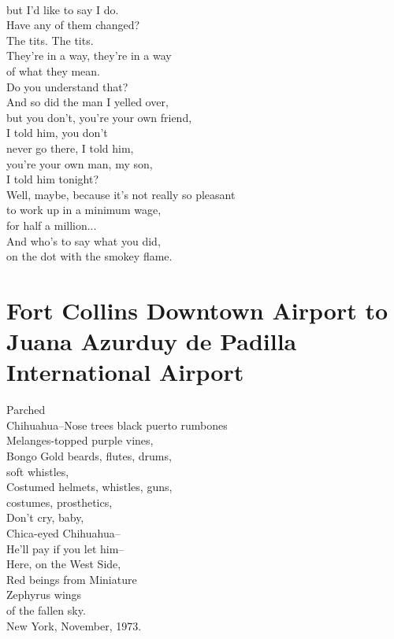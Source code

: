 \documentclass[smalldemyvopaper,11pt,twoside,onecolumn,openright,extrafontsizes]{memoir}
\begin{document}
\\but I'd like to say I do.
\\Have any of them changed?
\\The tits. The tits.
\\They're in a way, they're in a way
\\of what they mean.
\\Do you understand that?
\\And so did the man I yelled over,
\\but you don't, you're your own friend,
\\I told him, you don't
\\never go there, I told him,
\\you're your own man, my son,
\\I told him tonight?
\\Well, maybe, because it's not really so pleasant
\\to work up in a minimum wage,
\\for half a million...
\\And who's to say what you did,
\\on the dot with the smokey flame.



\chapter{Fort Collins Downtown Airport to Juana Azurduy de Padilla International Airport}
Parched
\\Chihuahua--Nose trees black puerto rumbones
\\Melanges-topped purple vines,
\\Bongo Gold beards, flutes, drums,
\\soft whistles,
\\Costumed helmets, whistles, guns,
\\costumes, prosthetics,
\\Don't cry, baby,
\\Chica-eyed Chihuahua--
\\He'll pay if you let him--
\\Here, on the West Side,
\\Red beings from Miniature
\\Zephyrus wings
\\of the fallen sky.
\\New York, November, 1973.
\end{document}
